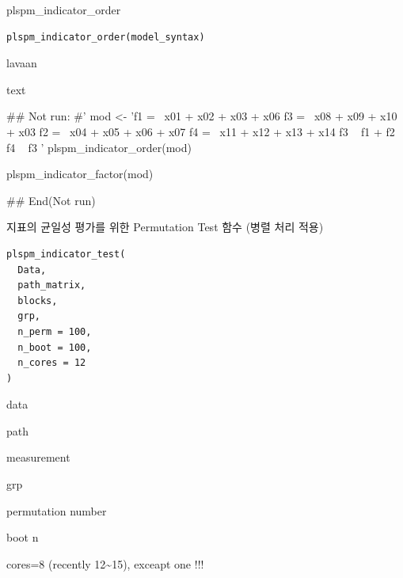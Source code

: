 \documentclass[a4paper]{book}
\begin{document}
%
\begin{Description}
plspm\_indicator\_order
\end{Description}
%
\begin{Usage}
\begin{verbatim}
plspm_indicator_order(model_syntax)
\end{verbatim}
\end{Usage}
%
\begin{Arguments}
\begin{ldescription}
\item[\code{model\_syntax}] lavaan
\end{ldescription}
\end{Arguments}
%
\begin{Value}
text
\end{Value}
%
\begin{Examples}
\begin{ExampleCode}
\#\# Not run: 
#'
mod <-
  'f1 =~ x01 + x02 + x03 + x06
    f3 =~ x08 + x09 + x10 + x03
    f2 =~ x04 + x05 + x06 + x07
    f4 =~ x11 + x12 + x13 + x14
    f3 ~ f1 + f2
    f4 ~ f3
   '
plspm_indicator_order(mod)

plspm_indicator_factor(mod)

## End(Not run)

\end{ExampleCode}
\end{Examples}
%
\begin{Description}
지표의 균일성 평가를 위한 Permutation Test 함수 (병렬 처리 적용)
\end{Description}
%
\begin{Usage}
\begin{verbatim}
plspm_indicator_test(
  Data,
  path_matrix,
  blocks,
  grp,
  n_perm = 100,
  n_boot = 100,
  n_cores = 12
)
\end{verbatim}
\end{Usage}
%
\begin{Arguments}
\begin{ldescription}
\item[\code{Data}] data

\item[\code{path\_matrix}] path

\item[\code{blocks}] measurement

\item[\code{grp}] grp

\item[\code{n\_perm}] permutation number

\item[\code{n\_boot}] boot n

\item[\code{n\_cores}] cores=8 (recently 12\textasciitilde{}15), exceapt one !!!
\end{ldescription}
\end{Arguments}
\end{document}
